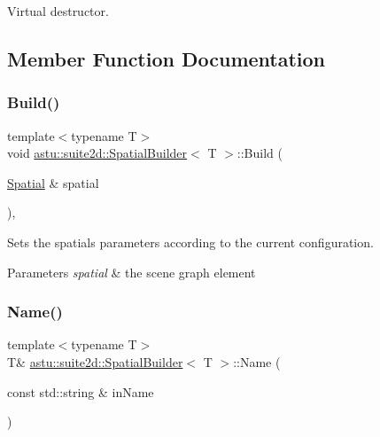 Virtual destructor. 

\subsection{Member Function Documentation}
\mbox{\label{classastu_1_1suite2d_1_1SpatialBuilder_a3d46a0e8a8fac126c7d926361a78cb82}} 
\subsubsection{\texorpdfstring{Build()}{Build()}}
{\footnotesize\ttfamily template$<$typename T$>$ \\
void \hyperlink{classastu_1_1suite2d_1_1SpatialBuilder}{astu\+::suite2d\+::\+Spatial\+Builder}$<$ T $>$\+::Build (\begin{DoxyParamCaption}\item[{\hyperlink{classastu_1_1suite2d_1_1Spatial}{Spatial} \&}]{spatial }\end{DoxyParamCaption})\hspace{0.3cm}{\ttfamily [inline]}, {\ttfamily [protected]}}

Sets the spatial\textquotesingle{}s parameters according to the current configuration.


\begin{DoxyParams}{Parameters}
{\em spatial} & the scene graph element \\
\hline
\end{DoxyParams}
\mbox{\label{classastu_1_1suite2d_1_1SpatialBuilder_a9acc5dba2568c4c5e9ee1b4b04c3e490}} 
\subsubsection{\texorpdfstring{Name()}{Name()}}
{\footnotesize\ttfamily template$<$typename T$>$ \\
T\& \hyperlink{classastu_1_1suite2d_1_1SpatialBuilder}{astu\+::suite2d\+::\+Spatial\+Builder}$<$ T $>$\+::Name (\begin{DoxyParamCaption}\item[{const std\+::string \&}]{in\+Name }\end{DoxyParamCaption})\hspace{0.3cm}{\ttfamily [inline]}}

